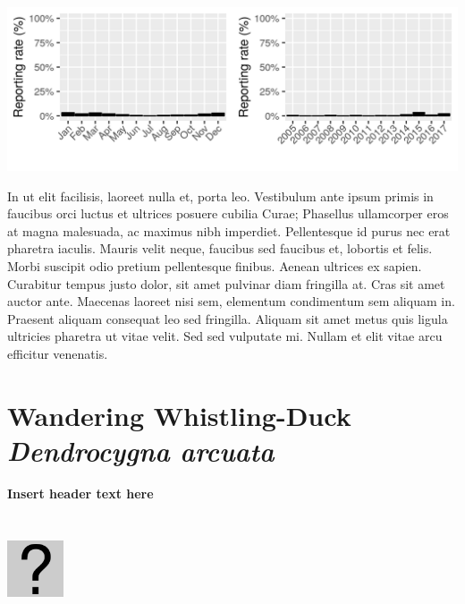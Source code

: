 \documentclass[12pt,openany,oneside]{book}
\let\origfigure\figure
\let\endorigfigure\endfigure
\renewenvironment{figure}[1][2] {
  \expandafter\origfigure\expandafter[H]
} {
  \endorigfigure
}
\theoremstyle{definition}
\theoremstyle{definition}
\theoremstyle{definition}
\theoremstyle{remark}
\begin{document}
\includegraphics{assets/graphs/Dendrocygna-eytoni.png}

In ut elit facilisis, laoreet nulla et, porta leo. Vestibulum ante ipsum
primis in faucibus orci luctus et ultrices posuere cubilia Curae;
Phasellus ullamcorper eros at magna malesuada, ac maximus nibh
imperdiet. Pellentesque id purus nec erat pharetra iaculis. Mauris velit
neque, faucibus sed faucibus et, lobortis et felis. Morbi suscipit odio
pretium pellentesque finibus. Aenean ultrices ex sapien. Curabitur
tempus justo dolor, sit amet pulvinar diam fringilla at. Cras sit amet
auctor ante. Maecenas laoreet nisi sem, elementum condimentum sem
aliquam in. Praesent aliquam consequat leo sed fringilla. Aliquam sit
amet metus quis ligula ultricies pharetra ut vitae velit. Sed sed
vulputate mi. Nullam et elit vitae arcu efficitur venenatis.

\clearpage

\hypertarget{wandering-whistling-duck-dendrocygna-arcuata}{%
\section{\texorpdfstring{Wandering Whistling-Duck \emph{Dendrocygna
arcuata}}{Wandering Whistling-Duck Dendrocygna arcuata}}\label{wandering-whistling-duck-dendrocygna-arcuata}}


\textbf{Insert header text here}

\begin{figure}
\centering
\includegraphics[width=63px,height=120px]{assets/profile/missing.png}
\caption{Insert caption here.}
\end{figure}
\end{document}
